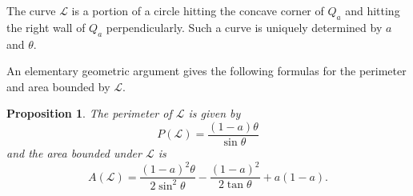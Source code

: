 \documentclass[leqno]{article}
\numberwithin{equation}{section}
\theoremstyle{definition}
\theoremstyle{remark}
\theoremstyle{plain}
\newtheorem{proposition}[equation]{Proposition}
\begin{document}
The curve $\mathcal{L}$ is a portion of a circle hitting the concave corner of $Q_a$ and hitting the right wall of $Q_a$ perpendicularly.  Such a curve is uniquely determined by  $a$ and $\theta$.

An elementary geometric argument gives the following formulas for the perimeter and area bounded by $\mathcal{L}$.

\begin{proposition}The perimeter of $\mathcal{L}$ is given by $$P(\mathcal{L}) = \frac{(1-a)\theta}{\sin \theta}$$ and the area bounded under $\mathcal{L}$ is $$A(\mathcal{L}) = \frac{(1-a)^2\theta}{2\sin^2 \theta} - \frac{(1-a)^2}{2\tan \theta} + a(1-a).$$

\end{proposition}
\end{document}
